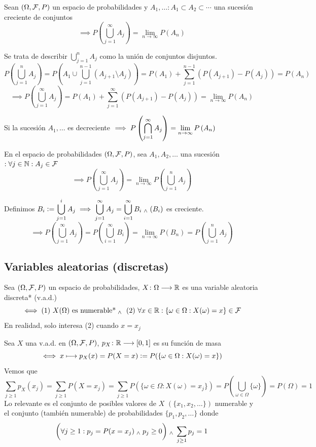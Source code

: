 \begin{prop}
	Sean $(\Omega, \mathcal{F}, P)$ un espacio de probabilidades y $ A_1, \dots : A_1 \subset A_2 \subset \cdots$ una sucesión creciente de conjuntos
	\[\implies P\left(\bigcup_{j=1}^\infty A_j\right)=\lim_{n\rightarrow\infty}P\left(A_n\right)\]
	\begin{dem}
		Se trata de describir $\bigcup_{j=1}^n A_j$ como la unión de conjuntos disjuntos.
		\[P\left(\bigcup_{j=1}^n A_j\right)=P\left(A_1\cup\bigcup_{j=1}^{n-1} \left(A_{j+1}\setminus A_j\right)\right)=P(A_1)+\sum_{j=1}^{n-1}\left(P(A_{j+1})-P(A_j)\right)=P(A_n)\]
		\[\implies P\left(\bigcup_{j=1}^\infty A_j\right) = P(A_1)+\sum_{j=1}^{\infty}\left(P(A_{j+1})-P(A_j)\right)=\lim_{n\rightarrow\infty}P(A_n)\]
	\end{dem}
\end{prop}

\begin{prop}
	Si la sucesión $A_1, \dots$ es decreciente
	$\displaystyle\implies P\left(\bigcap_{j=1}^\infty A_j\right)=\lim_{n\rightarrow\infty}P\left(A_n\right)$
\end{prop}

\begin{teo}
	En el espacio de probabilidades $(\Omega, \mathcal{F}, P)$, sea $A_1, A_2, \dots$ una sucesión $: \forall j \in \mathbb{N} : A_j \in \mathcal{F}$
	\[\implies P\left(\bigcup_{j=1}^\infty A_j\right)=\lim_{n\rightarrow\infty}P\left(\bigcup_{j=1}^n A_j\right)\]
	\begin{dem}
		Definimos $\displaystyle B_i\vcentcolon=\bigcup_{j=1}^i A_j \implies \bigcup_{j=1}^\infty A_j = \bigcup_{i=1}^\infty B_i \; _{\wedge} \; (B_i)$ es creciente.
		\[\implies P\left(\bigcup_{j=1}^\infty A_j\right) = P\left(\bigcup_{i=1}^\infty B_i\right) = \lim_{n\rightarrow\infty}P\left(B_n\right)=P\left(\bigcup_{j=1}^n A_j\right)\]
	\end{dem}
\end{teo}

\subsection{Variables aleatorias (discretas)}
\begin{defn}
	Sea $(\Omega, \mathcal{F}, P)$ un espacio de probabilidades, $X \colon \Omega \longrightarrow \mathbb{R}$ es una variable aleatoria discreta* (v.a.d.)
	\[\iff \text{(1) } X(\Omega) \text{ es numerable*} \; _{\wedge} \; \text{ (2) }\forall x \in \mathbb{R} : \{\omega \in \Omega : X(\omega)=x\} \in \mathcal{F}\]
	En realidad, solo interesa (2) cuando $x=x_j$
\end{defn}
\begin{defn}
	Sea $X$ una v.a.d. en $(\Omega, \mathcal{F}, P)$, $p_X \colon \mathbb{R} \longrightarrow \left[0,1\right]$ es su función de masa
	\[\iff x\longmapsto p_X(x)=P(X=x)\vcentcolon= P(\{\omega \in \Omega : X(\omega)=x\})\]
	Vemos que
	\[\sum_{j\geq1}p_X(x_j)=\sum_{j\geq1}P(X=x_j)=\sum_{j\geq1} P(\{\omega \in \Omega : X(\omega)=x_j\})=P\left(\bigcup_{\omega\in\Omega}\{\omega\}\right)=P(\Omega)=1\]
	Lo relevante es el conjunto de posibles valores de $X$ $(\{x_1, x_2, \dots\})$ numerable y el conjunto (también numerable) de probabilidades $\{p_1, p_2, \dots\}$ donde
	\[\bigg(\forall j \geq 1 : p_j=P(x=x_j) \; _{\wedge} \; p_j\geq 0 \bigg) \; _{\wedge} \; \sum_{j\geq 1}p_j=1\]
\end{defn}

